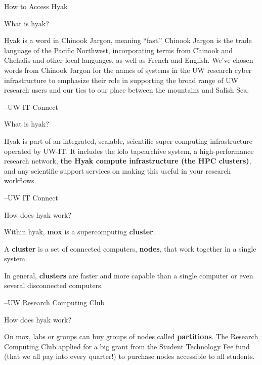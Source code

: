\documentclass[ignorenonframetext,]{beamer}
\begin{document}
\begin{frame}[fragile]{How to Access Hyak}

\begin{block}{What is hyak?}

Hyak is a word in Chinook Jargon, meaning ``fast.'' Chinook Jargon is
the trade language of the Pacific Northwest, incorporating terms from
Chinook and Chehalis and other local languages, as well as French and
English. We've chosen words from Chinook Jargon for the names of systems
in the UW research cyber infrastructure to emphasize their role in
supporting the broad range of UW research users and our ties to our
place between the mountains and Salish Sea.

--UW IT Connect

\end{block}

\begin{block}{What is hyak?}

Hyak is part of an integrated, scalable, scientific super-computing
infrastructure operated by UW-IT. It includes the lolo tapearchive
system, a high-performance research network, \textbf{the Hyak compute
infrastructure (the HPC clusters)}, and any scientific support services
on making this useful in your research workflows.

--UW IT Connect

\end{block}

\begin{block}{How does hyak work?}

Within hyak, \textbf{mox} is a supercomputing \textbf{cluster}.

A \textbf{cluster} is a set of connected computers, \textbf{nodes}, that
work together in a single system.

In general, \textbf{clusters} are faster and more capable than a single
computer or even several disconnected computers.

--UW Research Computing Club

\end{block}

\begin{block}{How does hyak work?}

On mox, labs or groups can buy groups of nodes called
\textbf{partitions}. The Research Computing Club applied for a big grant
from the Student Technology Fee fund (that we all pay into every
quarter!) to purchase nodes accessible to all students.


\end{block}
\end{frame}
\end{document}
